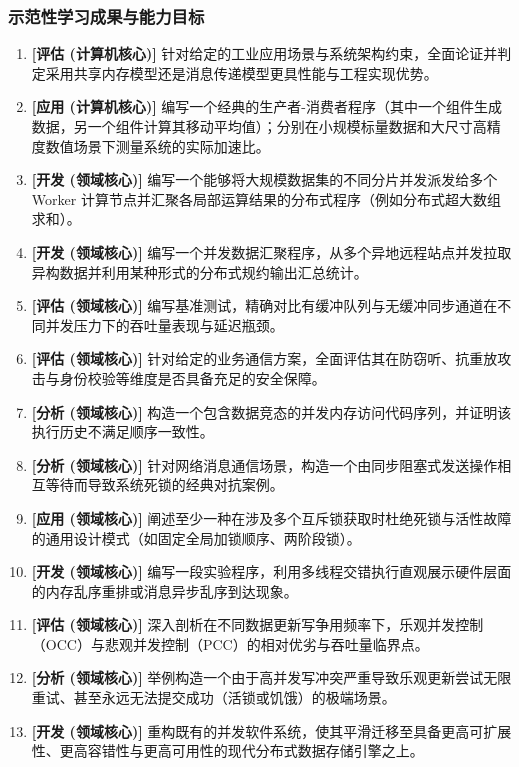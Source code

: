 \subsubsection{示范性学习成果与能力目标}
\begin{enumerate}
    \item \textbf{[评估 (计算机核心)]} 针对给定的工业应用场景与系统架构约束，全面论证并判定采用共享内存模型还是消息传递模型更具性能与工程实现优势。
    \item \textbf{[应用 (计算机核心)]} 编写一个经典的生产者-消费者程序（其中一个组件生成数据，另一个组件计算其移动平均值）；分别在小规模标量数据和大尺寸高精度数值场景下测量系统的实际加速比。
    \item \textbf{[开发 (领域核心)]} 编写一个能够将大规模数据集的不同分片并发派发给多个 Worker 计算节点并汇聚各局部运算结果的分布式程序（例如分布式超大数组求和）。
    \item \textbf{[开发 (领域核心)]} 编写一个并发数据汇聚程序，从多个异地远程站点并发拉取异构数据并利用某种形式的分布式规约输出汇总统计。
    \item \textbf{[评估 (领域核心)]} 编写基准测试，精确对比有缓冲队列与无缓冲同步通道在不同并发压力下的吞吐量表现与延迟瓶颈。
    \item \textbf{[评估 (领域核心)]} 针对给定的业务通信方案，全面评估其在防窃听、抗重放攻击与身份校验等维度是否具备充足的安全保障。
    \item \textbf{[分析 (领域核心)]} 构造一个包含数据竞态的并发内存访问代码序列，并证明该执行历史不满足顺序一致性。
    \item \textbf{[分析 (领域核心)]} 针对网络消息通信场景，构造一个由同步阻塞式发送操作相互等待而导致系统死锁的经典对抗案例。
    \item \textbf{[应用 (领域核心)]} 阐述至少一种在涉及多个互斥锁获取时杜绝死锁与活性故障的通用设计模式（如固定全局加锁顺序、两阶段锁）。
    \item \textbf{[开发 (领域核心)]} 编写一段实验程序，利用多线程交错执行直观展示硬件层面的内存乱序重排或消息异步乱序到达现象。
    \item \textbf{[评估 (领域核心)]} 深入剖析在不同数据更新写争用频率下，乐观并发控制（OCC）与悲观并发控制（PCC）的相对优劣与吞吐量临界点。
    \item \textbf{[分析 (领域核心)]} 举例构造一个由于高并发写冲突严重导致乐观更新尝试无限重试、甚至永远无法提交成功（活锁或饥饿）的极端场景。
    \item \textbf{[开发 (领域核心)]} 重构既有的并发软件系统，使其平滑迁移至具备更高可扩展性、更高容错性与更高可用性的现代分布式数据存储引擎之上。
\end{enumerate}

